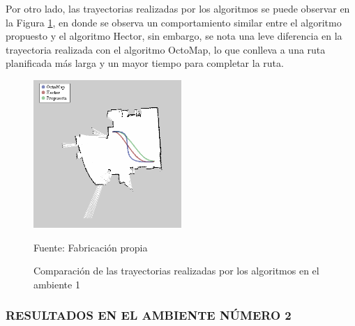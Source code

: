 Por otro lado, las trayectorias realizadas por los algoritmos se puede observar en la Figura \ref{fig:tray_01}, en donde se observa un comportamiento similar entre el algoritmo propuesto y el algoritmo Hector, sin embargo, se nota una leve diferencia en la trayectoria realizada con el algoritmo OctoMap, lo que conlleva a una ruta planificada más larga y un mayor tiempo para completar la ruta.

\begin{figure}[H]
    \centering
    \includegraphics[width=0.5\textwidth]{figures/05experimentacion/r00.png}
    \caption{ Comparación de las trayectorias realizadas por los algoritmos en el ambiente 1} 
    \label{fig:tray_01}
    Fuente: Fabricación propia
\end{figure}

\subsubsection{RESULTADOS EN EL AMBIENTE NÚMERO 2}

